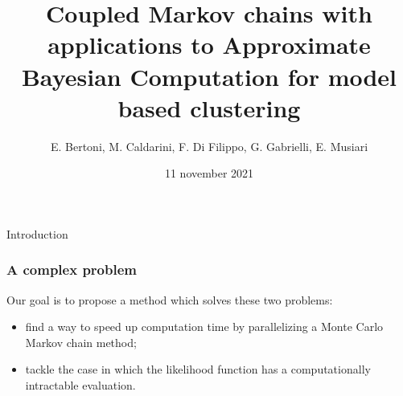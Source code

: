 \documentclass{beamer}
\title{Coupled Markov chains with applications to Approximate Bayesian Computation for model based clustering}
\author{E. Bertoni, M. Caldarini, F. Di Filippo, G. Gabrielli, E. Musiari}
\date{11 november 2021}
\begin{document}
\begin{frame}
\maketitle
\end{frame}

\begin{section}{Introduction}

	\begin{frame}
		\frametitle{A complex problem}
 		
 		Our goal is to propose a method which solves these two problems:
 		
 		\begin{itemize}
 			\item find a way to speed up computation time by parallelizing a Monte Carlo Markov chain method;
 			
 			
 			\item tackle the case in which the likelihood function has a computationally intractable evaluation. 
 			
 		\end{itemize}
	\end{frame}

\end{section}
\end{document}
